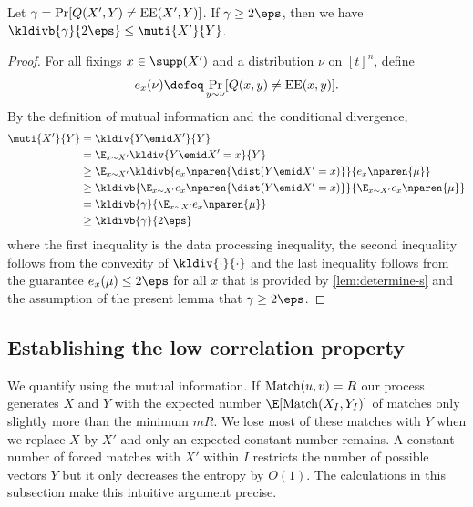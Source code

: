 \begin{lemma}
\label{lem:kl-err}
Let $\gamma = \Pr[Q(X',Y)\neq \operatorname{EE}(X',Y)]$. 
If $\gamma \ge 2\eps$, then we have $\kldivb{\gamma}{2\eps}\le \muti{X'}{Y}$.
\end{lemma}
\begin{proof}
For all fixings $x\in\supp(X')$ and a distribution $\nu$
on $[t]^n$, define 
\begin{align*}
e_{x}(\nu) \defeq \Pr_{y\sim \nu}[Q(x, y)\neq\EE(x, y)].
\end{align*}
By the definition of mutual information and the conditional divergence, 
\begin{align*}
\muti{X'}{Y}
    &=   \kldiv{Y\emid X'}{Y}\\
    &=   \E_{x\sim X'}\kldiv{Y\emid X'=x}{Y}\\
    &\ge \E_{x\sim X'}
         \kldivb{e_x\nparen{\dist(Y\emid X'=x)}}
                         {e_x\nparen{\mu}}\\
    &\ge \kldivb{\E_{x\sim X'}e_x\nparen{\dist(Y\emid X'=x)}}
                         {\E_{x\sim X'}e_x\nparen{\mu}}\\
    &= \kldivb{\gamma}{\E_{x\sim X'}e_x\nparen{\mu}}\\
    &\ge \kldivb{\gamma}{2\eps}
\end{align*}
where the first inequality is the data processing inequality,
the second inequality follows from the convexity of $\kldiv{\cdot}{\cdot}$
and the last inequality follows from 
the guarantee $e_x(\mu)\le 2\eps$ 
for all $x$ that is provided by \autoref{lem:determine-s}
and the assumption of the present lemma that $\gamma\ge 2\eps$.
\end{proof}

\subsection{Establishing the low correlation property}

We quantify  using the mutual information. 
If $\operatorname{Match}(u,v)=R$ our process generates $X$
and $Y$ with the expected number $\E[\Match(X_I,Y_I)]$ of
matches only slightly more than the minimum $mR$. We lose most
of these matches with $Y$ when we replace $X$ by $X'$ and only
an expected constant number remains. A constant number of forced
matches with $X'$ within $I$ restricts the number of possible
vectors $Y$ but it only decreases the entropy by $O(1)$. The
calculations in this subsection make this intuitive argument
precise.

